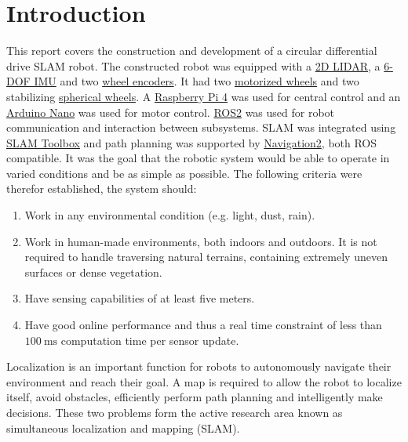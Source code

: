 \section{Introduction}
\label{section:intro}

This report covers the construction and development of a circular differential drive SLAM robot. 
The constructed robot was equipped with a \href{https://www.mouser.se/ProductDetail/426-DFR0315}{2D LIDAR}, a \href{https://www.mouser.se/ProductDetail/426-SEN0142}{6-DOF IMU} and two \href{https://www.amazon.se/dp/B07WP3XDLC?psc=1&ref=ppx_yo2ov_dt_b_product_details}{wheel encoders}. It had two \href{https://www.amazon.se/dp/B07WP3XDLC?psc=1&ref=ppx_yo2ov_dt_b_product_details}{motorized wheels} and two stabilizing \href{https://www.mouser.se/ProductDetail/485-3948}{spherical wheels}. A \href{https://www.electrokit.com/en/raspberry-pi-4-model-b/8gb}{Raspberry Pi 4} was used for central control and an \href{https://store.arduino.cc/products/arduino-nano}{Arduino Nano} was used for motor control. 
\href{https://docs.ros.org/en/foxy/index.html}{ROS2} was used for robot communication and interaction between subsystems. SLAM was integrated using \href{https://wiki.ros.org/slam_toolbox}{SLAM Toolbox} and path planning was supported by \href{https://navigation.ros.org/tutorials/docs/navigation2_with_slam.html}{Navigation2}, both ROS compatible.
It was the goal that the robotic system would be able to operate in varied conditions and be as simple as possible. The following criteria were therefor established, the system should:
\begin{enumerate}
    \item Work in any environmental condition (e.g. light, dust, rain).
    \item Work in human-made environments, both indoors and outdoors. It is not required to handle traversing natural terrains, containing extremely uneven surfaces or dense vegetation.
    \item Have sensing capabilities of at least five meters.
    \item Have good online performance and thus a real time constraint of less than $100\:\text{ms}$ computation time per sensor update.
\end{enumerate}

Localization is an important function for robots to autonomously navigate their environment and reach their goal\:\cite{kondo_localizability_2022}. A map is required to allow the robot to localize itself, avoid obstacles, efficiently perform path planning and intelligently make decisions\:\cite{kondo_localizability_2022}\cite{andriawan_eka_wijaya_research_2019}\cite{cai_lidarinertial_2023}\cite{placed_survey_2023}. These two problems form the active research area known as simultaneous localization and mapping (SLAM)\:\cite{kondo_localizability_2022}\cite{mu_occupancy_2022}\cite{khole_comprehensive_2023}.

